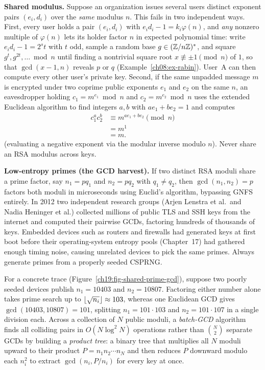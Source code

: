 \begin{attackbox}
\textbf{Shared modulus.} Suppose an organization issues several users distinct exponent pairs $(e_i, d_i)$ over the \emph{same} modulus $n$. This fails in two independent ways. First, every user holds a pair $(e_i, d_i)$ with $e_i d_i - 1 = k_i \varphi(n)$, and \emph{any} nonzero multiple of $\varphi(n)$ lets its holder factor $n$ in expected polynomial time: write $e_i d_i - 1 = 2^s t$ with $t$ odd, sample a random base $g \in (\mathbb{Z}/n\mathbb{Z})^{*}$, and square $g^t, g^{2t}, \dots \bmod n$ until finding a nontrivial square root $x \not\equiv \pm 1 \pmod n$ of $1$, so that $\gcd(x-1, n)$ reveals $p$ or $q$ (Example~\ref{ch08:ex-rabin}). User~A can then compute every other user's private key. Second, if the same unpadded message $m$ is encrypted under two coprime public exponents $e_1$ and $e_2$ on the same $n$, an eavesdropper holding $c_1 = m^{e_1} \bmod n$ and $c_2 = m^{e_2} \bmod n$ uses the extended Euclidean algorithm to find integers $a, b$ with $a e_1 + b e_2 = 1$ and computes
\begin{align*}
  c_1^{a} c_2^{b} &\equiv m^{a e_1 + b e_2} \pmod n \\
                  &= m^1 \\
                  &= m.
\end{align*}
(evaluating a negative exponent via the modular inverse modulo $n$). Never share an RSA modulus across keys.
\end{attackbox}

\begin{attackbox}
\textbf{Low-entropy primes (the GCD harvest).} If two distinct RSA moduli share a prime factor, say $n_1 = p q_1$ and $n_2 = p q_2$ with $q_1 \ne q_2$, then $\gcd(n_1,n_2) = p$ factors both moduli in microseconds using Euclid's algorithm, bypassing GNFS entirely. In 2012 two independent research groups (Arjen Lenstra et al.\ and Nadia Heninger et al.) collected millions of public TLS and SSH keys from the internet and computed their pairwise GCDs, factoring hundreds of thousands of keys. Embedded devices such as routers and firewalls had generated keys at first boot before their operating-system entropy pools (Chapter~17) had gathered enough timing noise, causing unrelated devices to pick the same primes. Always generate primes from a properly seeded CSPRNG.

For a concrete trace (Figure~\ref{ch19:fig-shared-prime-gcd}), suppose two poorly seeded devices publish $n_1 = 10403$ and $n_2 = 10807$. Factoring either number alone takes prime search up to $\lfloor\sqrt{n_i}\rfloor \approx 103$, whereas one Euclidean GCD gives $\gcd(10403,10807) = 101$, splitting $n_1 = 101\cdot 103$ and $n_2 = 101\cdot 107$ in a single division each. Across a collection of $N$ public moduli, a \emph{batch-GCD} algorithm finds all colliding pairs in $O(N\log^2 N)$ operations rather than $\binom{N}{2}$ separate GCDs by building a \emph{product tree}: a binary tree that multiplies all $N$ moduli upward to their product $P = n_1 n_2 \cdots n_N$ and then reduces $P$ downward modulo each $n_i^2$ to extract $\gcd(n_i, P/n_i)$ for every key at once.
\end{attackbox}

